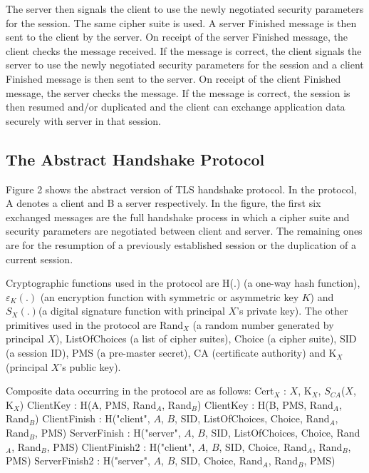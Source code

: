\documentclass[a4paper,fleqn]{cas-dc}
\begin{document}
The server then signals the client to use the newly negotiated security parameters for the session. The same cipher suite is used. A server Finished message is then sent to the client by the server. On receipt of the server Finished message, the client checks the message received. If the message is correct, the client signals the server to use the newly negotiated security parameters for the session and a client Finished message is then sent to the server. On receipt of the client Finished message, the server checks the message. If the message is correct, the session is then resumed and/or duplicated and the client can exchange application data securely with server in that session.

\subsection{The Abstract Handshake Protocol}\label{abstracthandshake}
Figure 2 shows the abstract version of TLS handshake protocol. In the protocol, A denotes a client and B a server respectively. In the figure, the first six exchanged messages are the full handshake process in which a cipher suite and security parameters are negotiated between client and server. The remaining ones are for the resumption of a previously established session or the duplication of a current session.

Cryptographic functions used in the protocol are H(.)
(a one-way hash function), $\varepsilon_K(.)$ (an encryption function with symmetric or asymmetric key $K$) and $S_X(.)$(a digital signature function with principal $X$’s private key). The other primitives used in the protocol are Rand$_X$ (a random number generated by principal $X$), ListOfChoices (a list of cipher suites), Choice (a cipher suite), SID (a session ID), PMS (a pre-master secret), CA (certificate authority) and K$_X$ (principal $X$'s public key).

Composite data occurring in the protocol are as follows:
Cert$_X$ : $X$, K$_X$, $S_{CA}$($X$, K$_X$) \newline
ClientKey : H(A, PMS, Rand$_A$, Rand$_B$) \newline
ClientKey : H(B, PMS, Rand$_A$, Rand$_B$) \newline
ClientFinish : H("client", $A$, $B$, SID, ListOfChoices, Choice, Rand$_A$, Rand$_B$, PMS)\newline
ServerFinish : H("server", $A$, $B$, SID, ListOfChoices, Choice, Rand$_A$, Rand$_B$, PMS)\newline
ClientFinish2 : H("client", $A$, $B$, SID, Choice, Rand$_A$, Rand$_B$, PMS)\newline
ServerFinish2 : H("server", $A$, $B$, SID, Choice, Rand$_A$, Rand$_B$, PMS)\newline
\end{document}
